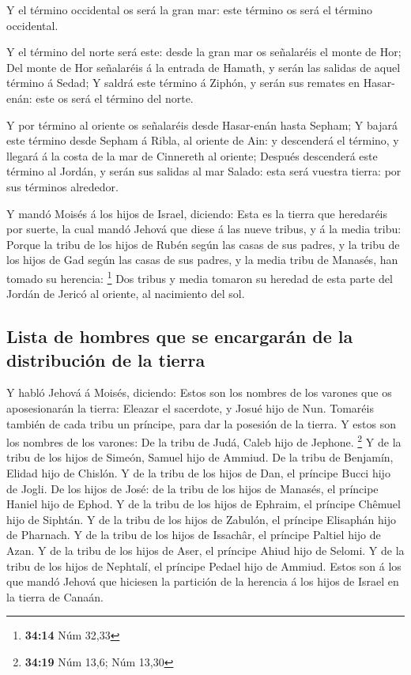  Y el término occidental os será la gran mar: este término
os será el término occidental.

 Y el término del norte será este: desde la gran mar os
señalaréis el monte de Hor;  Del monte de Hor señalaréis á
la entrada de Hamath, y serán las salidas de aquel término á Sedad;
 Y saldrá este término á Ziphón, y serán sus remates en
Hasar-enán: este os será el término del norte.

 Y por término al oriente os señalaréis desde Hasar-enán
hasta Sepham;  Y bajará este término desde Sepham á Ribla,
al oriente de Ain: y descenderá el término, y llegará á la costa de la
mar de Cinnereth al oriente;  Después descenderá este
término al Jordán, y serán sus salidas al mar Salado: esta será vuestra
tierra: por sus términos alrededor.

 Y mandó Moisés á los hijos de Israel, diciendo: Esta es la
tierra que heredaréis por suerte, la cual mandó Jehová que diese á las
nueve tribus, y á la media tribu:  Porque la tribu de los
hijos de Rubén según las casas de sus padres, y la tribu de los hijos de
Gad según las casas de sus padres, y la media tribu de Manasés, han
tomado su herencia: \footnote{\textbf{34:14} Núm 32,33} 
Dos tribus y media tomaron su heredad de esta parte del Jordán de Jericó
al oriente, al nacimiento del sol.

\hypertarget{lista-de-hombres-que-se-encargaruxe1n-de-la-distribuciuxf3n-de-la-tierra}{%
\subsection{Lista de hombres que se encargarán de la distribución de la
tierra}\label{lista-de-hombres-que-se-encargaruxe1n-de-la-distribuciuxf3n-de-la-tierra}}

 Y habló Jehová á Moisés, diciendo:  Estos son
los nombres de los varones que os aposesionarán la tierra: Eleazar el
sacerdote, y Josué hijo de Nun.  Tomaréis también de cada
tribu un príncipe, para dar la posesión de la tierra.  Y
estos son los nombres de los varones: De la tribu de Judá, Caleb hijo de
Jephone. \footnote{\textbf{34:19} Núm 13,6; Núm 13,30}  Y
de la tribu de los hijos de Simeón, Samuel hijo de Ammiud. 
De la tribu de Benjamín, Elidad hijo de Chislón.  Y de la
tribu de los hijos de Dan, el príncipe Bucci hijo de Jogli.
 De los hijos de José: de la tribu de los hijos de Manasés,
el príncipe Haniel hijo de Ephod.  Y de la tribu de los
hijos de Ephraim, el príncipe Chêmuel hijo de Siphtán.  Y
de la tribu de los hijos de Zabulón, el príncipe Elisaphán hijo de
Pharnach.  Y de la tribu de los hijos de Issachâr, el
príncipe Paltiel hijo de Azan.  Y de la tribu de los hijos
de Aser, el príncipe Ahiud hijo de Selomi.  Y de la tribu
de los hijos de Nephtalí, el príncipe Pedael hijo de Ammiud.
 Estos son á los que mandó Jehová que hiciesen la partición
de la herencia á los hijos de Israel en la tierra de Canaán.

